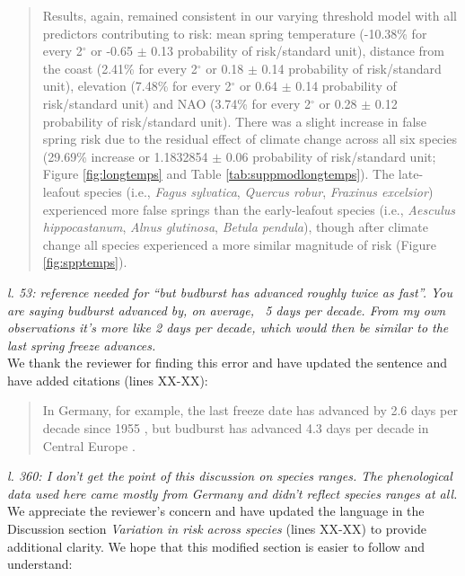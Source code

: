 \documentclass[11pt,a4paper]{article}\usepackage[]{graphicx}\usepackage[]{color}
\begin{document}
\begin{quotation}
\noindent  Results, again, remained consistent in our varying threshold model with all predictors contributing to risk: mean spring temperature (-10.38\% for every 2$^\circ$ or -0.65 $\pm$ 0.13 probability of risk/standard unit), distance from the coast (2.41\% for every 2$^\circ$ or 0.18 $\pm$ 0.14 probability of risk/standard unit), elevation (7.48\% for every 2$^\circ$ or 0.64 $\pm$ 0.14 probability of risk/standard unit) and NAO (3.74\% for every 2$^\circ$ or 0.28 $\pm$ 0.12 probability of risk/standard unit). There was a slight increase in false spring risk due to the residual effect of climate change across all six species (29.69\% increase or 1.1832854 $\pm$ 0.06 probability of risk/standard unit; Figure \ref{fig:longtemps} and Table \ref{tab:suppmodlongtemps}). The late-leafout species (i.e., \textit{Fagus sylvatica}, \textit{Quercus robur}, \textit{Fraxinus excelsior}) experienced more false springs than the early-leafout species (i.e., \textit{Aesculus hippocastanum}, \textit{Alnus glutinosa}, \textit{Betula pendula}), though after climate change all species experienced a more similar magnitude of risk (Figure \ref{fig:spptemps}).
\end{quotation}

\textit{l. 53: reference needed for ``but budburst has advanced roughly twice as fast''. You are saying budburst advanced by, on average, ~5 days per decade. From my own observations it's more like 2 days per decade, which would then be similar to the last spring freeze advances.} \\

We thank the reviewer for finding this error and have updated the sentence and have added citations (lines XX-XX): \\

\begin{quotation}
\noindent  In Germany, for example, the last freeze date has advanced by 2.6 days per decade since 1955 \citep{Zohner2016}, but budburst has advanced 4.3 days per decade in Central Europe \citep{Fu2014,Vitasse2018}.
\end{quotation}


\textit{l. 360: I don't get the point of this discussion on species ranges. The phenological data used here came mostly from Germany and didn't reflect species ranges at all.} \\

We appreciate the reviewer's concern and have updated the language in the Discussion section \textit{Variation in risk across species} (lines XX-XX) to provide additional clarity. We hope that this modified section is easier to follow and understand:  \\
\end{document}
